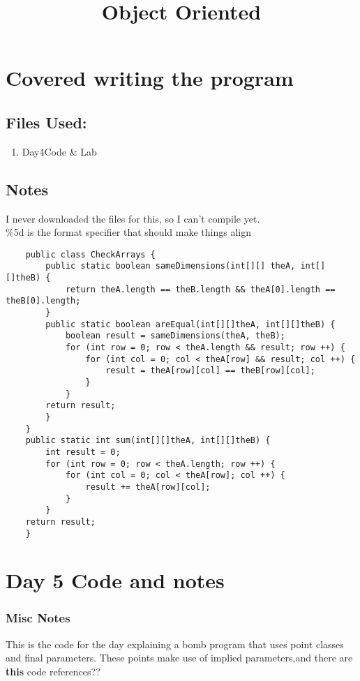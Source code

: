 \documentclass{article}
\begin{document}
\title{Object Oriented}
\maketitle

\section{Covered writing the program }

    \subsection{Files Used:}

    \begin{enumerate}
        \item{Day4Code \& Lab} 
    \end{enumerate}

    \subsection{Notes}
    I never downloaded the files for this, so I can't compile yet. \\
    \%5d is the format specifier that should make things align
    
    \begin{lstlisting}
    public class CheckArrays {
        public static boolean sameDimensions(int[][] theA, int[][]theB) {
            return theA.length == theB.length && theA[0].length == theB[0].length;
        }
        public static boolean areEqual(int[][]theA, int[][]theB) {
            boolean result = sameDimensions(theA, theB);
            for (int row = 0; row < theA.length && result; row ++) {
                for (int col = 0; col < theA[row] && result; col ++) {
                    result = theA[row][col] == theB[row][col];
                }
            }
        return result;
        }
    }
    public static int sum(int[][]theA, int[][]theB) {
        int result = 0;
        for (int row = 0; row < theA.length; row ++) {
            for (int col = 0; col < theA[row]; col ++) {
                result += theA[row][col];
            }
        }
    return result;
    }
    \end{lstlisting}

\section{Day 5 Code and notes}
    \subsubsection{ Misc Notes}
This is the code for the day explaining a bomb program that uses point classes and final parameters. These points make use of implied parameters,and there are \textbf{this} code references?? \\
\end{document}
